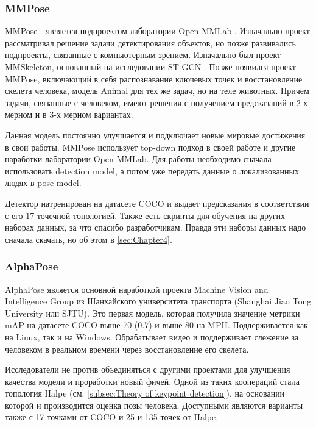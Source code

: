 \subsubsection{MMPose}
\label{subsubsec:mmpose_desc}

MMPose - является подпроектом лаборатории Open-MMLab \cite{mmpose2020}. Изначально проект рассматривал решение задачи детектирования объектов, но позже развивались подпроекты, связанные с компьютерным зрением. Изначально был проект MMSkeleton, основанный на исследовании ST-GCN \cite{STGCN}. Позже появился проект MMPose, включающий в себя распознавание ключевых точек и восстановление скелета человека, модель Animal для тех же задач, но на теле животных. Причем задачи, связанные с человеком, имеют решения с получением предсказаний в 2-х мерном и в 3-х мерном вариантах.

Данная модель постоянно улучшается и подключает новые мировые достижения в свои работы. MMPose использует top-down подход в своей работе и другие наработки лаборатории Open-MMLab. Для работы необходимо сначала использовать detection model, а потом уже передать данные о локализованных людях в pose model.

Детектор натренирован на датасете COCO и выдает предсказания в соответствии с его 17 точечной топологией. Также есть скрипты для обучения на других наборах данных, за что спасибо разработчикам. Правда эти наборы данных надо сначала скачать, но об этом в \autoref{sec:Chapter4}.



\subsubsection{AlphaPose}
\label{subsubsec:alphapose_desc}

AlphaPose является основной наработкой проекта Machine Vision and Intelligence Group из Шанхайского университета транспорта (Shanghai Jiao Tong University или SJTU). Это первая модель, которая получила значение метрики mAP на датасете COCO выше 70 (0.7) и выше 80 на MPII. Поддерживается как на Linux, так и на Windows. Обрабатывает видео и поддерживает слежение за человеком в реальном времени через восстановление его скелета.

Исследователи не против объединяться с другими проектами для улучшения качества модели и проработки новый фичей. Одной из таких коопераций стала топология Halpe (см. \autoref{subsec:Theory of keypoint detection}), на основании которой и производится оценка позы человека. Доступными являются варианты также с 17 точками от COCO и 25 и 135 точек от Halpe.

